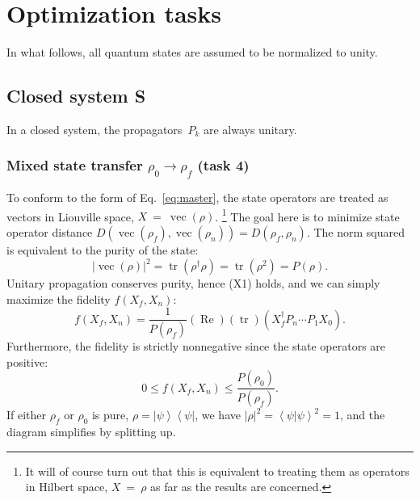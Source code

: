 \documentclass[aps, pra, a4paper, longbibliography]{revtex4}
\newcommand{\be}{\begin{equation}}
\newcommand{\ee}{\end{equation}}
\newcommand{\braket}[2]{\left \langle #1 | #2 \right \rangle}
\newcommand{\ketbra}[2]{\left| #1 \right \rangle \left \langle #2 \right|}
\DeclareMathOperator{\tr}{tr}
\DeclareMathOperator{\re}{Re}
\DeclareMathOperator{\cvec}{vec}
\begin{document}
\section{Optimization tasks}

In what follows, all quantum states are assumed to be normalized to unity.


\subsection{Closed system S}

In a closed system, the propagators~$P_k$ are always unitary.

\subsubsection{Mixed state transfer $\rho_0 \to \rho_f$ (task 4)}
\label{sec:closed-mixed}

To conform to the form of Eq.~\eqref{eq:master},
the state operators are treated as vectors in Liouville space, $X~=~\cvec(\rho)$.
\footnote{It will of course turn out that this is equivalent to treating them as operators in Hilbert
space, $X~=~\rho$ as far as the results are concerned.}
The goal here is to minimize state operator distance
$D(\cvec(\rho_f), \cvec(\rho_n)) = D(\rho_f, \rho_n)$.
The norm squared is equivalent to the purity of the state:
\be
|\cvec(\rho)|^2
= \tr(\rho^\dagger \rho)
= \tr(\rho^2)
= P(\rho).
\ee
Unitary propagation conserves purity, hence (X1) holds, and we can
simply maximize the fidelity $f(X_f, X_n)$:
\be
f(X_f, X_n)
= \frac{1}{P(\rho_f)} (\re) (\tr) \left( X_f^\dagger  P_n \cdots P_1 X_0 \right).
\ee
Furthermore, the fidelity is strictly nonnegative since the
state operators are positive:
\be
0 \le f(X_f, X_n) \le \frac{P(\rho_0)}{P(\rho_f)}.
\ee
If either $\rho_f$ or $\rho_0$ is pure,
$\rho = \ketbra{\psi}{\psi}$,
we have $|\rho|^2 = \braket{\psi}{\psi}^2 = 1$, and
the diagram simplifies by splitting up.
\end{document}

